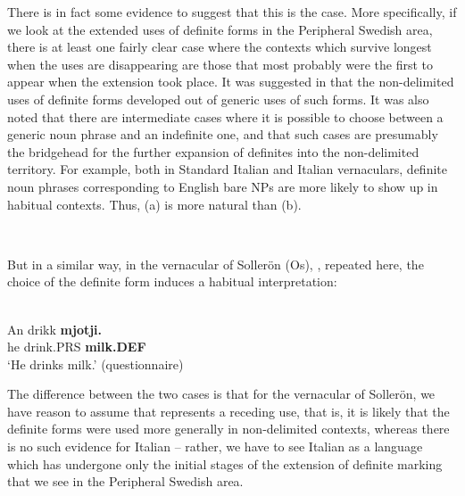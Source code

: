 There is in fact some evidence to suggest that this is the case. More specifically, if we look at the extended uses of definite forms in the Peripheral Swedish area, there is at least one fairly clear case where the contexts which survive longest when the uses are disappearing are those that most probably were the first to appear when the extension took place. It was suggested in  that the non-delimited uses of definite forms developed out of generic uses of such forms. It was also noted that there are intermediate cases where it is possible to choose between a generic noun phrase and an indefinite one, and that such cases are presumably the bridgehead for the further expansion of definites into the non-delimited territory. For example, both in Standard Italian and Italian vernaculars, definite noun phrases corresponding to English bare NPs are more likely to show up in habitual contexts. Thus, (a) is more natural than (b).

\ea\label{}
\\

\z 
\z

But in a similar way, in the vernacular of Sollerön (Os), , repeated here, the choice of the definite form induces a habitual interpretation:

\ea\label{ex:54}
\\
\gll An  drikk  \textbf{mjotji.}\\
he  drink.PRS  \textbf{milk.DEF}\\
\glt ‘He drinks milk.’ (questionnaire)
\z

The difference between the two cases is that for the vernacular of Sollerön, we have reason to assume that  represents a receding use, that is, it is likely that the definite forms were used more generally in non-delimited contexts, whereas there is no such evidence for Italian – rather, we have to see Italian as a language which has undergone only the initial stages of the extension of definite marking that we see in the Peripheral Swedish area. 

